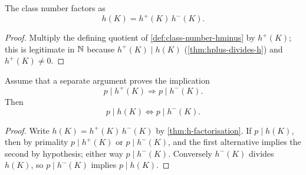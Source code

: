 \begin{theorem}\label{thm:h-factorisation}
  \leanok
The class number factors as
\[
  h(K)=h^+(K)\,h^-(K).
\]
\end{theorem}
\begin{proof}\leanok
Multiply the defining quotient of \cref{def:class-number-hminus} by
$h^+(K)$; this is legitimate in $\mathbb{N}$ because $h^+(K) \mid h(K)$
(\cref{thm:hplus-divides-h}) and $h^+(K) \ne 0$.
\end{proof}

\begin{theorem}\label{thm:dvd-h-iff-dvd-hminus-from-plus-to-minus}
  \leanok
Assume that a separate argument proves the implication
\[
  p\mid h^+(K)\Longrightarrow p\mid h^-(K).
\]
Then
\[
  p\mid h(K)\Longleftrightarrow p\mid h^-(K).
\]
\end{theorem}
\begin{proof}\leanok
Write $h(K) = h^+(K)\,h^-(K)$ by \cref{thm:h-factorisation}.  If $p \mid
h(K)$, then by primality $p\mid h^+(K)$ or $p\mid h^-(K)$, and the first
alternative implies the second by hypothesis; either way $p \mid h^-(K)$.
Conversely $h^-(K)$ divides $h(K)$, so $p \mid h^-(K)$ implies
$p \mid h(K)$.
\end{proof}
